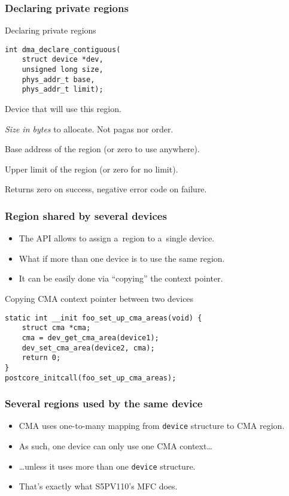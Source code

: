\begin{frame}[fragile]
  \frametitle{Declaring private regions}

  \begin{block}{Declaring private regions}
\begin{lstlisting}
int dma_declare_contiguous(
    struct device *dev,
    unsigned long size,
    phys_addr_t base,
    phys_addr_t limit);
\end{lstlisting}
  \end{block}

  \begin{description}[count]
  \item[dev] Device that will use this region.
  \item[size] \emph{Size in bytes} to allocate. {\footnotesize Not
    pagas nor order.}
  \item[base] Base address of the region (or zero to use anywhere).
  \item[limit] Upper limit of the region (or zero for no limit).
  \item Returns zero on success, negative error code on failure.
  \end{description}
\end{frame}

\begin{frame}[fragile]
  \frametitle{Region shared by several devices}

  \begin{itemize}
  \item The API allows to assign a~region to a~single device.
  \item What if more than one device is to use the same region.
  \item It can be easily done via “copying” the context pointer.
  \end{itemize}

  \begin{block}{Copying CMA context pointer between two devices}
\begin{lstlisting}
static int __init foo_set_up_cma_areas(void) {
    struct cma *cma;
    cma = dev_get_cma_area(device1);
    dev_set_cma_area(device2, cma);
    return 0;
}
postcore_initcall(foo_set_up_cma_areas);
\end{lstlisting}
  \end{block}
\end{frame}

\begin{frame}
  \frametitle{Several regions used by the same device}

  \begin{itemize}
  \item CMA uses one-to-many mapping from \lstinline|device| structure
    to CMA region.
  \item As such, one device can only use one CMA context\ldots
  \item \ldots unless it uses more than one \lstinline|device|
    structure.
  \item That's exactly what S5PV110's MFC does.
  \end{itemize}
\end{frame}

